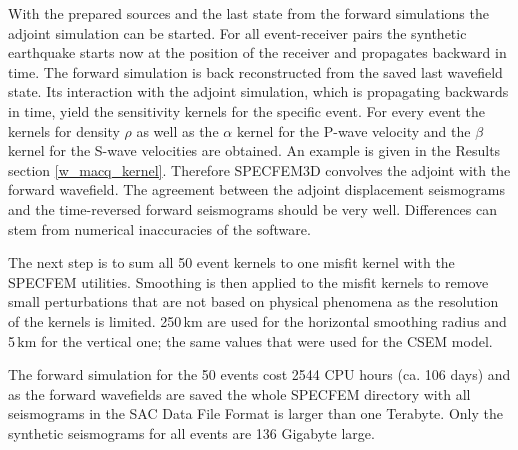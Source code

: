 With the prepared sources and the last state from the forward simulations the adjoint simulation can be started.
For all event-receiver pairs the synthetic earthquake starts now at the position of the receiver and propagates
backward in time.  
The forward simulation is back reconstructed from the saved last wavefield state. 
Its interaction with the adjoint simulation, which is propagating backwards in time,
yield the sensitivity kernels for the specific event. 
For every event the kernels for density $\rho$ as well as the $\alpha$ kernel for the P-wave velocity and the
$\beta$ kernel for the S-wave velocities are obtained. 
An example is given in the Results section \autoref{w_macq_kernel}.
Therefore SPECFEM3D convolves the adjoint with the forward wavefield.
The agreement between the adjoint displacement seismograms and the time-reversed forward seismograms should be very well. %
Differences can stem from numerical inaccuracies of the software. %

The next step is to sum all 50 event kernels to one misfit kernel with the SPECFEM utilities.
Smoothing is then applied to the misfit kernels to remove small perturbations that are not based on physical phenomena as the 
resolution of the kernels is limited.
250$\,$km are used for the horizontal smoothing radius and 5$\,$km for the vertical one; the same values that were used for the
CSEM model.

The forward simulation for the 50 events cost 2544 CPU hours (ca. 106 days) and as the forward wavefields are saved the whole 
SPECFEM directory with all seismograms in the SAC Data File Format is larger than one Terabyte.
Only the synthetic seismograms for all events are 136 Gigabyte large.






